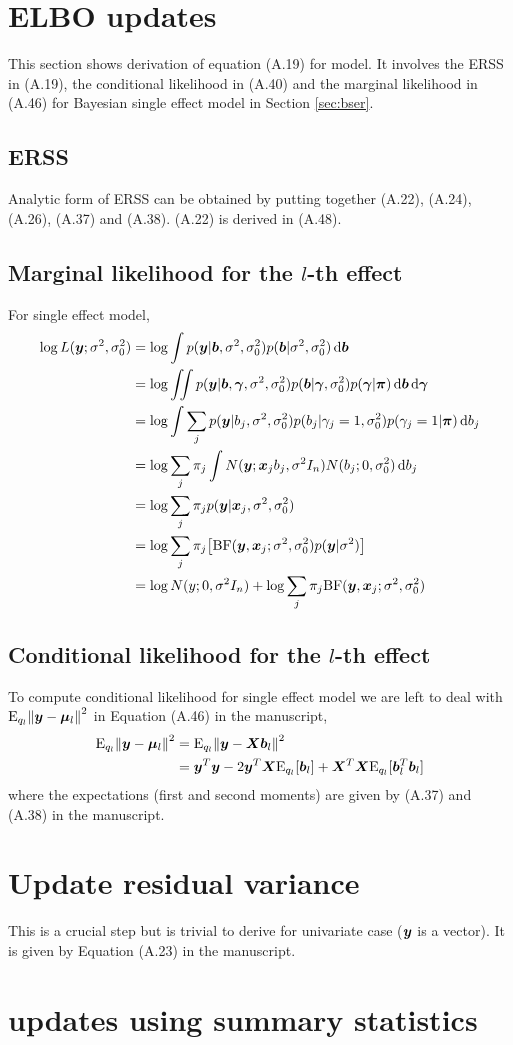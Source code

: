 \section{ELBO updates}

This section shows derivation of equation (A.19) for \susie model. It involves the ERSS in (A.19), the conditional likelihood in (A.40) and the marginal likelihood in (A.46) for Bayesian single effect model in Section \ref{sec:bser}. 

\subsection{ERSS}

Analytic form of ERSS can be obtained by putting together (A.22), (A.24), (A.26), (A.37) and (A.38). (A.22) is derived in (A.48).

\subsection{Marginal likelihood for the $l$-th effect}

For single effect model,
\begin{align}
    \log L(\vy; \rv, \rv_0) &= \log \int p(\vy | \vb, \rv, \rv_0) p(\vb | \rv, \rv_0) \dif \vb\\
    &= \log \iint p(\vy | \vb, \vgamma, \rv, \rv_0) p(\vb | \vgamma, \rv_0) p(\vgamma | \vpi)  \dif \vb \dif \vgamma \\
    &= \log \int \sum_j p(\vy | b_j, \rv, \rv_0) p(b_j|\gamma_j = 1, \rv_0) p(\gamma_j = 1 | \vpi) \dif b_j \\
    &= \log \sum_j \pi_j \int N(\vy; \vx_jb_j, \rv I_n) N(b_j; 0, \rv_0) \dif b_j \\
    &= \log \sum_j \pi_j p(\vy|\vx_j, \rv, \rv_0) \\
    &= \log \sum_j \pi_j \big[\BF(\vy, \vx_j; \rv, \rv_0)p(\vy|\rv) \big]\\
    &= \log N(y; 0, \rv I_n) + \log \sum_j \pi_j \BF(\vy, \vx_j; \rv, \rv_0)
\end{align}

\subsection{Conditional likelihood for the $l$-th effect}

To compute conditional likelihood for single effect model we are left to deal with $\text{E}_{q_l}\norm{\bm y - \bm \mu_l}^2$ in Equation (A.46) in the manuscript,
\begin{align}
    \text{E}_{q_l}\norm{\bm y - \bm \mu_l}^2 &= \text{E}_{q_l}\norm{\bm y - \bm X\bm b_l}^2 \\
    &= \bm y^T\bm y - 2\bm y^T\bm X \text{E}_{q_l}[\bm b_l] + \bm X^T\bm X \text{E}_{q_l}[\bm b_l^T\bm b_l]
\end{align}
where the expectations (first and second moments) are given by (A.37) and (A.38) in the manuscript.

\section{Update residual variance}
This is a crucial step but is trivial to derive for univariate case ($\bm y$ is a vector). It is given by Equation (A.23) in the manuscript.

\section{\susie updates using summary statistics}